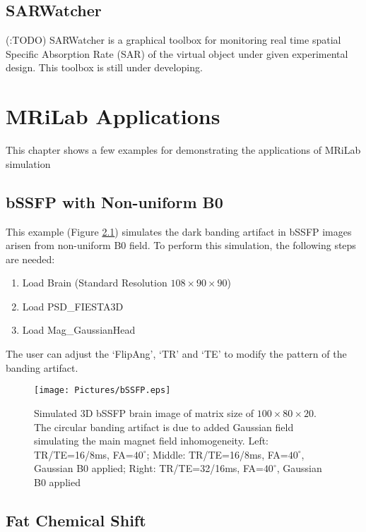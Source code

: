 \documentclass{book}%
\begin{document}
\section{SARWatcher}
(:TODO) SARWatcher is a graphical toolbox for monitoring real time spatial Specific Absorption Rate (SAR) of the virtual object under given experimental design. This toolbox is still under developing.

\chapter{MRiLab Applications}

This chapter shows a few examples for demonstrating the applications of MRiLab simulation

\section{bSSFP with Non-uniform B0}

This example (Figure \ref{fig:bSSFP}) simulates the dark banding artifact in bSSFP images arisen from non-uniform B0 field. To perform this simulation, the following steps are needed:

\begin{enumerate}
	\item Load Brain (Standard Resolution $108 \times 90 \times 90$)
  \item Load PSD\_FIESTA3D
	\item Load Mag\_GaussianHead
\end{enumerate}

The user can adjust the `FlipAng', `TR' and `TE' to modify the pattern of the banding artifact. 

\begin{figure}[htbp]
	\centering
		\texttt{[image: Pictures/bSSFP.eps]}
	\caption{Simulated 3D bSSFP brain image of matrix size of $100 \times 80 \times 20$. The circular banding artifact is due to added Gaussian field simulating the main magnet field inhomogeneity. Left: TR/TE=16/8ms, FA=$40^{\circ}$; Middle: TR/TE=16/8ms, FA=$40^{\circ}$, Gaussian B0 applied; Right: TR/TE=32/16ms, FA=$40^{\circ}$, Gaussian B0 applied}
	\label{fig:bSSFP}
\end{figure}


\section{Fat Chemical Shift}
\end{document}
